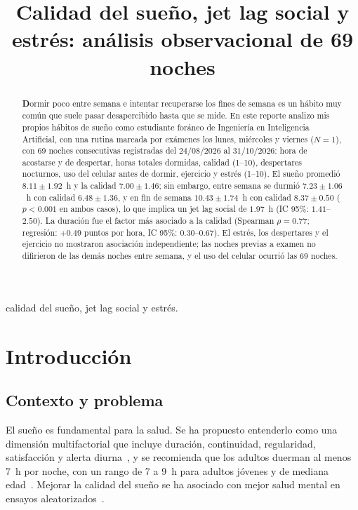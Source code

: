 \documentclass[conference]{IEEEtran}
\begin{document}
\title{Calidad del sueño, jet lag social y estrés: análisis observacional de 69 noches}

\author{
}


\maketitle

\begin{abstract}
\textbf Dormir poco entre semana e intentar recuperarse los fines de semana es un hábito muy común que suele pasar desapercibido hasta que se mide. En este reporte analizo mis propios hábitos de sueño como estudiante foráneo de Ingeniería en Inteligencia Artificial, con una rutina marcada por exámenes los lunes, miércoles y viernes ($N=1$), con 69 noches consecutivas registradas del $24/08/2026$ al $31/10/2026$: hora de acostarse y de despertar, horas totales dormidas, calidad (1--10), despertares nocturnos, uso del celular antes de dormir, ejercicio y estrés (1--10). El sueño promedió $8.11\pm1.92$~h y la calidad $7.00\pm1.46$; sin embargo, entre semana se durmió $7.23\pm1.06$~h con calidad $6.48\pm1.36$, y en fin de semana $10.43\pm1.74$~h con calidad $8.37\pm0.50$ ($p < 0.001$ en ambos casos), lo que implica un jet lag social de $1.97$~h (IC 95\%: $1.41$--$2.50$). La duración fue el factor más asociado a la calidad (Spearman $\rho=0.77$; regresión: $+0.49$ puntos por hora, IC 95\%: $0.30$--$0.67$). El estrés, los despertares y el ejercicio no mostraron asociación independiente; las noches previas a examen no difirieron de las demás noches entre semana, y el uso del celular ocurrió las 69 noches.
\end{abstract}

\begin{IEEEkeywords}
calidad del sueño, jet lag social y estrés.
\end{IEEEkeywords}

\section{Introducción}

\subsection{Contexto y problema}
El sueño es fundamental para la salud. Se ha propuesto entenderlo como una dimensión multifactorial que incluye duración, continuidad, regularidad, satisfacción y alerta diurna~\cite{ref1}, y se recomienda que los adultos duerman al menos 7~h por noche, con un rango de 7 a 9~h para adultos jóvenes y de mediana edad~\cite{ref2,ref3}. Mejorar la calidad del sueño se ha asociado con mejor salud mental en ensayos aleatorizados~\cite{ref4}.
\end{document}

